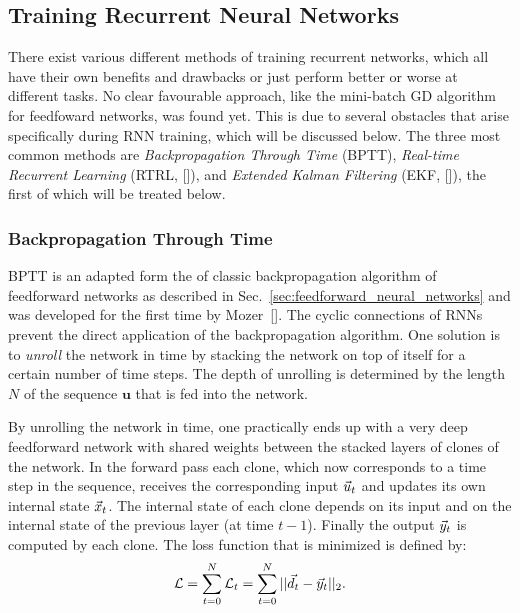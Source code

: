 \subsection{Training Recurrent Neural Networks}
\label{sub:training_recurrent_neural_networks}

There exist various different methods of training recurrent networks, which all
have their own benefits and drawbacks or just perform better or worse at
different tasks. No clear favourable approach, like the mini-batch GD algorithm
for feedfoward networks, was found yet.  This is due to several obstacles that
arise specifically during RNN training, which will be discussed below.  The
three most common methods are \emph{Backpropagation Through Time} (BPTT),
\emph{Real-time Recurrent Learning} (RTRL, [\cite{williams1989}]), and
\emph{Extended Kalman Filtering} (EKF, [\cite{williams1992}]), the first of which
will be treated below.

\subsubsection{Backpropagation Through Time}
\label{ssub:backpropagation_through_time}

BPTT is an adapted form the of classic backpropagation algorithm of feedforward
networks as described in Sec.~\ref{sec:feedforward_neural_networks} and was
developed for the first time by Mozer~[\cite{mozerBPTT}].  The
cyclic connections of RNNs prevent the direct application of the
backpropagation algorithm.  One solution is to \emph{unroll} the network in
time by stacking the network on top of itself for a certain number of time
steps.  The depth of unrolling is determined by the length $N$ of the sequence
$\mathbf{u}$ that is fed into the network.

By unrolling the network in time, one practically ends up with a very deep
feedforward network with shared weights between the stacked layers of clones of
the network.  In the forward pass each clone, which now corresponds to a time
step in the sequence, receives the corresponding input $\vec{u}_t$ and updates its
own internal state $\vec{x}_t$.  The internal state of each clone depends on its
input and on the internal state of the previous layer (at time $t-1$).  Finally
the output $\vec{y}_t$ is computed by each clone.  The loss function that is
minimized is defined by:
\begin{equation}
  \mathcal{L} = \sum_{t=0}^{N} \mathcal{L}_t
              = \sum_{t=0}^{N} || \vec{d}_t - \vec{y}_t ||_2.
\end{equation}

